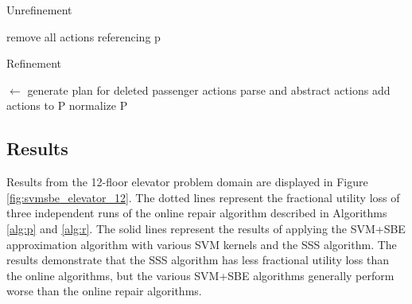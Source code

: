 \begin{algorithm}
\caption{Unrefinement}
\label{alg:p}

\begin{algorithmic}[1] 
  
      \State remove all actions referencing p
    \EndIf
  \EndFor

\end{algorithmic}
\end{algorithm}


\begin{algorithm}
\caption{Refinement}
\label{alg:r}

\begin{algorithmic}[1] 
   $\leftarrow$ generate plan for deleted passenger actions
  \State parse and abstract {actions}
  \State add {actions} to P
  \State normalize P
\end{algorithmic}
\end{algorithm}




\subsection{Results}

Results from the 12-floor elevator problem domain are displayed in Figure \ref{fig:svmsbe_elevator_12}.  The dotted lines represent the fractional utility loss of three independent runs of the online repair algorithm described in Algorithms \ref{alg:p} and \ref{alg:r}.  The solid lines represent the results of applying the SVM+SBE approximation algorithm with various SVM kernels and the SSS algorithm.  The results demonstrate that the SSS algorithm has less fractional utility loss than the online algorithms, but the various SVM+SBE algorithms generally perform worse than the online repair algorithms.


